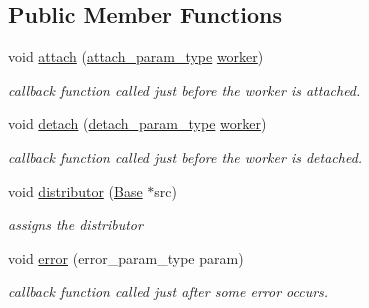 \subsection*{Public Member Functions}
\begin{DoxyCompactItemize}
\item 
void \hyperlink{classhryky_1_1task_1_1worker_1_1_base_1_1_observer_aef35602a4e0be27fa2adb725c4e5e1c2}{attach} (\hyperlink{classhryky_1_1task_1_1worker_1_1_base}{attach\-\_\-param\-\_\-type} \hyperlink{classhryky_1_1task_1_1distributor_1_1_base_a69590e9a4cbe85a69eeb6d5477e994cd}{worker})
\begin{DoxyCompactList}\small\item\em callback function called just before the worker is attached. \end{DoxyCompactList}\item 
void \hyperlink{classhryky_1_1task_1_1worker_1_1_base_1_1_observer_a006d60c6079bb4b48d4cdac44b5377db}{detach} (\hyperlink{classhryky_1_1task_1_1worker_1_1_base}{detach\-\_\-param\-\_\-type} \hyperlink{classhryky_1_1task_1_1distributor_1_1_base_a69590e9a4cbe85a69eeb6d5477e994cd}{worker})
\begin{DoxyCompactList}\small\item\em callback function called just before the worker is detached. \end{DoxyCompactList}\item 
\hypertarget{classhryky_1_1task_1_1distributor_1_1_base_1_1_worker_observer_a54b231849b0ff42c96eaa37f5bc3d9de}{void \hyperlink{classhryky_1_1task_1_1distributor_1_1_base_1_1_worker_observer_a54b231849b0ff42c96eaa37f5bc3d9de}{distributor} (\hyperlink{classhryky_1_1task_1_1distributor_1_1_base}{Base} $\ast$src)}\label{classhryky_1_1task_1_1distributor_1_1_base_1_1_worker_observer_a54b231849b0ff42c96eaa37f5bc3d9de}

\begin{DoxyCompactList}\small\item\em assigns the distributor \end{DoxyCompactList}\item 
void \hyperlink{classhryky_1_1task_1_1worker_1_1_base_1_1_observer_a93a45d6703ea5f96ffaab7fc52cffa73}{error} (error\-\_\-param\-\_\-type param)
\begin{DoxyCompactList}\small\item\em callback function called just after some error occurs. \end{DoxyCompactList}\end{DoxyCompactItemize}


